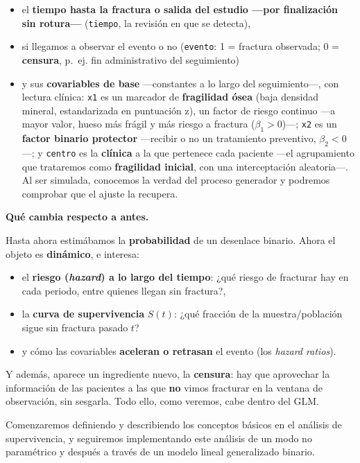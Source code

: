 \documentclass[
  letterpaper,
  DIV=11,
  numbers=noendperiod]{scrartcl}
\providecommand{\tightlist}{%
  \setlength{\itemsep}{0pt}\setlength{\parskip}{0pt}}\usepackage{longtable,booktabs,array}
\begin{document}
\begin{itemize}
\tightlist
\item
  el \textbf{tiempo hasta la fractura o salida del estudio ---por
  finalización sin rotura---} (\texttt{tiempo}, la revisión en que se
  detecta),
\item
  si llegamos a observar el evento o no (\texttt{evento}: 1 = fractura
  observada; 0 = \textbf{censura}, p.~ej. fin administrativo del
  seguimiento)
\item
  y sus \textbf{covariables de base} ---constantes a lo largo del
  seguimiento---, con lectura clínica: \texttt{x1} es un marcador de
  \textbf{fragilidad ósea} (baja densidad mineral, estandarizada en
  puntuación z), un factor de riesgo continuo ---a mayor valor, hueso
  más frágil y más riesgo a fractura (\(\beta_1>0\))---; \texttt{x2} es
  un \textbf{factor binario protector} ---recibir o no un tratamiento
  preventivo, \(\beta_2<0\)---; y \texttt{centro} es la \textbf{clínica}
  a la que pertenece cada paciente ---el agrupamiento que trataremos
  como \textbf{fragilidad inicial}, con una interceptación aleatoria---.
  Al ser simulada, conocemos la verdad del proceso generador y podremos
  comprobar que el ajuste la recupera.
\end{itemize}

\textbf{Qué cambia respecto a antes.}

Hasta ahora estimábamos la \textbf{probabilidad} de un desenlace
binario. Ahora el objeto es \textbf{dinámico}, e interesa:

\begin{itemize}
\tightlist
\item
  el \textbf{riesgo (\emph{hazard}) a lo largo del tiempo}: ¿qué riesgo
  de fracturar hay en cada periodo, entre quienes llegan sin fractura?,
\item
  la \textbf{curva de supervivencia} \(S(t)\): ¿qué fracción de la
  muestra/población sigue sin fractura pasado \(t\)?
\item
  y cómo las covariables \textbf{aceleran o retrasan} el evento (los
  \emph{hazard ratios}).
\end{itemize}

Y además, aparece un ingrediente nuevo, la \textbf{censura}: hay que
aprovechar la información de las pacientes a las que \textbf{no} vimos
fracturar en la ventana de observación, sin sesgarla. Todo ello, como
veremos, cabe dentro del GLM.

Comenzaremos definiendo y describiendo los conceptos básicos en el
análisis de supervivencia, y seguiremos implementando este análisis de
un modo no paramétrico y después a través de un modelo lineal
generalizado binario.
\end{document}
